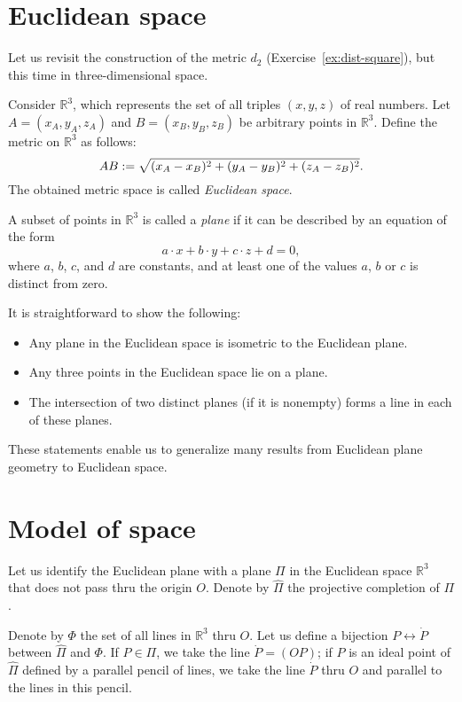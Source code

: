 \section{Euclidean space}

Let us revisit the construction of the metric $d_2$ (Exercise~\ref{ex:dist-square}), but this time in three-dimensional space. 

Consider $\mathbb{R}^3$, which represents the set of all triples $(x,y,z)$ of real numbers.
Let  $A=(x_A,y_A,z_A)$ and $B=(x_B,y_B,z_B)$ be arbitrary points in $\mathbb{R}^3$.
Define the metric on $\mathbb{R}^3$ as follows:
$$AB
:=
\sqrt{(x_A-x_B)^2+(y_A-y_B)^2+(z_A-z_B)^2}.$$
The obtained metric space is called \emph{Euclidean space}.

A subset of points in $\mathbb{R}^3$ is called a \emph{plane} if it can be
described by an equation of the form
$$a\cdot x+b\cdot y+c\cdot z+d=0,$$ 
where $a$, $b$, $c$, and $d$ are constants, and at least one of the values $a$, $b$ or $c$ is distinct from zero.

It is straightforward to show the following:
\begin{itemize}
 \item Any plane in the Euclidean space is isometric to the Euclidean plane.
 \item Any three points in the Euclidean space lie on a plane.
 \item The  intersection of two distinct planes (if it is nonempty) forms a line in each of these planes.
\end{itemize}

These statements enable us to generalize many results from Euclidean plane geometry to Euclidean space.

\section{Model of space}

Let us identify the Euclidean plane with a plane $\Pi$ in the Euclidean space $\mathbb{R}^3$ that does not pass thru the origin $O$.
Denote by $\hat\Pi$ the projective completion of $\Pi$.

Denote by $\Phi$ the set of all lines in $\mathbb{R}^3$ thru $O$.
Let us define a bijection $P\leftrightarrow \dot P$ between $\hat \Pi$ and $\Phi$.
If $P\in \Pi$, we take the line $\dot P=(OP)$;
if $P$ is an ideal point of $\hat \Pi$ defined by a parallel pencil of lines, we take the line $\dot P$ thru $O$ and parallel to the lines in this pencil.

